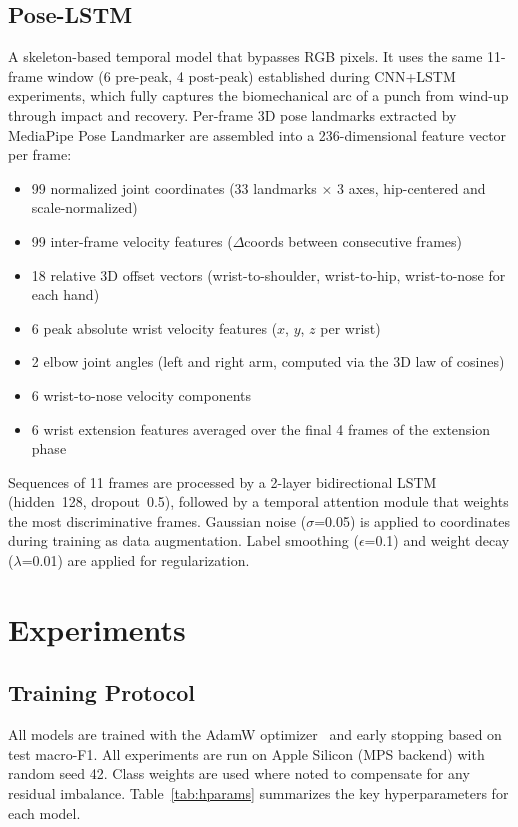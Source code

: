 \documentclass[conference]{IEEEtran}
\begin{document}
\subsection{Pose-LSTM}
A skeleton-based temporal model that bypasses RGB pixels. It uses the same
11-frame window (6 pre-peak, 4 post-peak) established during CNN+LSTM
experiments, which fully captures the biomechanical arc of a punch from
wind-up through impact and recovery. Per-frame 3D pose landmarks extracted by
MediaPipe Pose Landmarker are assembled into a 236-dimensional feature vector
per frame:
\begin{itemize}
    \item 99 normalized joint coordinates (33 landmarks $\times$ 3 axes,
    hip-centered and scale-normalized)
    \item 99 inter-frame velocity features ($\Delta$coords between consecutive
    frames)
    \item 18 relative 3D offset vectors (wrist-to-shoulder, wrist-to-hip,
    wrist-to-nose for each hand)
    \item 6 peak absolute wrist velocity features ($x$, $y$, $z$ per wrist)
    \item 2 elbow joint angles (left and right arm, computed via the 3D law of
    cosines)
    \item 6 wrist-to-nose velocity components
    \item 6 wrist extension features averaged over the final 4 frames of the
    extension phase
\end{itemize}
Sequences of 11 frames are processed by a 2-layer bidirectional LSTM
(hidden~128, dropout~0.5), followed by a temporal attention module that
weights the most discriminative frames. Gaussian noise ($\sigma$=0.05) is
applied to coordinates during training as data augmentation. Label smoothing
($\epsilon$=0.1) and weight decay ($\lambda$=0.01) are applied for
regularization.

\section{Experiments}

\subsection{Training Protocol}
All models are trained with the AdamW optimizer~\cite{loshchilov2019decoupled}
and early stopping based on test macro-F1. All experiments are run on Apple
Silicon (MPS backend) with random seed 42. Class weights are used where noted
to compensate for any residual imbalance. Table~\ref{tab:hparams} summarizes
the key hyperparameters for each model.
\end{document}
